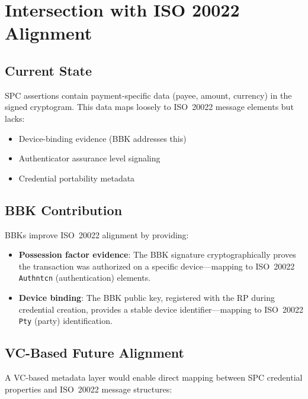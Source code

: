 \documentclass[12pt,a4paper]{article}
\begin{document}
\newpage
\section{Intersection with ISO 20022 Alignment}

\subsection{Current State}

SPC assertions contain payment-specific data (payee, amount, currency) in the signed cryptogram. This data maps loosely to ISO~20022 message elements but lacks:
\begin{itemize}[noitemsep,topsep=2pt]
  \item Device-binding evidence (BBK addresses this)
  \item Authenticator assurance level signaling
  \item Credential portability metadata
\end{itemize}

\subsection{BBK Contribution}

BBKs improve ISO~20022 alignment by providing:
\begin{itemize}[noitemsep,topsep=2pt]
  \item \textbf{Possession factor evidence}: The BBK signature cryptographically proves the transaction was authorized on a specific device---mapping to ISO~20022 \texttt{Authntcn} (authentication) elements.
  \item \textbf{Device binding}: The BBK public key, registered with the RP during credential creation, provides a stable device identifier---mapping to ISO~20022 \texttt{Pty} (party) identification.
\end{itemize}

\subsection{VC-Based Future Alignment}

A VC-based metadata layer would enable direct mapping between SPC credential properties and ISO~20022 message structures:
\end{document}
